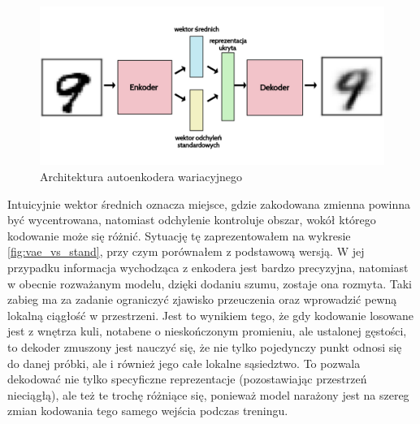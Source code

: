 \begin{figure}[h!]
    \centering
    \includegraphics[width=1.0\textwidth]{images/vae}
    \caption{Architektura autoenkodera wariacyjnego}
    \label{fig:vae_model}
\end{figure}

Intuicyjnie wektor średnich oznacza miejsce, gdzie zakodowana zmienna powinna być wycentrowana, natomiast odchylenie kontroluje obszar, wokół którego kodowanie może się różnić. Sytuację tę zaprezentowałem na wykresie \ref{fig:vae_vs_stand}, przy czym porównałem z podstawową wersją. W jej przypadku informacja wychodząca z enkodera jest bardzo precyzyjna, natomiast w obecnie rozważanym modelu, dzięki dodaniu szumu, zostaje ona rozmyta. Taki zabieg ma za zadanie ograniczyć zjawisko przeuczenia oraz wprowadzić pewną lokalną ciągłość w przestrzeni. Jest to wynikiem tego, że gdy kodowanie losowane jest z wnętrza kuli, notabene o nieskończonym promieniu, ale ustalonej gęstości, to dekoder zmuszony jest nauczyć się, że nie tylko pojedynczy punkt odnosi się do danej próbki, ale i również jego całe lokalne sąsiedztwo. To pozwala dekodować nie tylko specyficzne reprezentacje (pozostawiając przestrzeń nieciągłą), ale też te trochę różniące się, ponieważ model narażony jest na szereg zmian kodowania tego samego wejścia podczas treningu.

